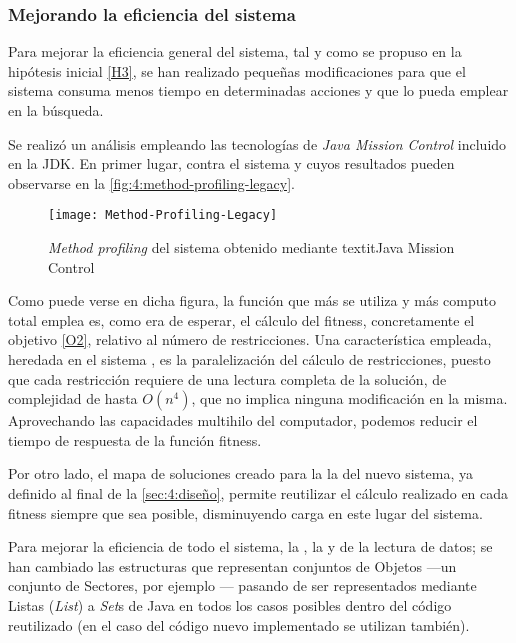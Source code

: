 \subsubsection{Mejorando la eficiencia del sistema}
\label{sec:4:mejorando-eficiencia}

Para mejorar la eficiencia general del sistema, tal y como se propuso en la hipótesis inicial \ref{H3}, se han realizado pequeñas modificaciones para que el sistema consuma menos tiempo en determinadas acciones y que lo pueda emplear en la búsqueda.

Se realizó un análisis empleando las tecnologías de \textit{Java Mission Control} incluido en la JDK. En primer lugar, contra el sistema \legacy{} y cuyos resultados pueden observarse en la \autoref{fig:4:method-profiling-legacy}.

\begin{figure}
	\centering
	\texttt{[image: Method-Profiling-Legacy]}
	\caption{\textit{Method profiling} del sistema \legacy{} obtenido mediante textit{Java Mission Control}}
	\label{fig:4:method-profiling-legacy}
\end{figure}

Como puede verse en dicha figura, la función que más se utiliza y más computo total emplea es, como era de esperar, el cálculo del fitness, concretamente el objetivo \ref{O2}, relativo al número de restricciones. Una característica empleada, heredada en el sistema \legacy{}, es la paralelización del cálculo de restricciones, puesto que cada restricción requiere de una lectura completa de la solución, de complejidad de hasta $O(n^4)$, que no implica ninguna modificación en la misma. Aprovechando las capacidades multihilo del computador, podemos reducir el tiempo de respuesta de la función fitness. 

Por otro lado, el mapa de soluciones creado para la la \fasedos{} del nuevo sistema, ya definido al final de la \autoref{sec:4:diseño}, permite reutilizar el cálculo realizado en cada fitness siempre que sea posible, disminuyendo carga en este lugar del sistema. 

Para mejorar la eficiencia de todo el sistema, la \faseuno{}, la \fasedos{} y de la lectura de datos; se han cambiado las estructuras que representan conjuntos de Objetos ---un conjunto de Sectores, por ejemplo --- pasando de ser representados mediante Listas (\textit{List}) a \textit{Set}s de Java en todos los casos posibles dentro del código \legacy{} reutilizado (en el caso del código nuevo implementado se utilizan también). 

